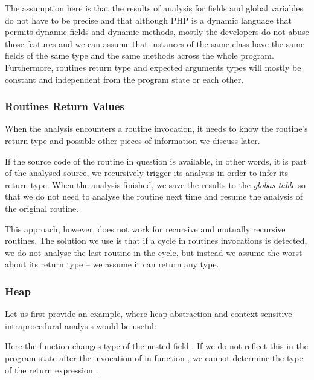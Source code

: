        The assumption here is that the results of analysis for fields 
        and global variables do not have to be precise and that although 
        PHP is a dynamic language that permits dynamic fields and dynamic 
        methods, mostly the developers do not abuse those features and 
        we can assume that instances of the same class have the same 
        fields of the same type and the same methods across the whole 
        program. Furthermore, routines return type and expected 
        arguments types will mostly be constant and independent 
        from the program state or each other.
        
        \subsubsection*{Routines Return Values}
        When the analysis encounters a routine invocation, it needs 
        to know the routine's return type and possible other pieces 
        of information we discuss later.
        
        If the source code of the routine in question is available, 
        in other words, it is part of the analysed source, we 
        recursively trigger its analysis in order to infer its 
        return type. When the analysis finished, we save the 
        results to the \emph{globas table} so that we do not 
        need to analyse the routine next time and resume the 
        analysis of the original routine.
        
        This approach, however, does not work for recursive 
        and mutually recursive routines. The solution we use 
        is that if a cycle in routines invocations is detected, 
        we do not analyse the last routine in the cycle, but 
        instead we assume the worst about its return type -- 
        we assume it can return any type.
        
        
        \subsubsection*{Heap}        
        Let us first provide an example, where heap abstraction and 
        context sensitive intraprocedural analysis would be useful:
        
%
        
        Here the function  changes type of the nested field 
        . If we do not reflect this in the program 
        state after the invocation of  in 
        function , we cannot determine the type of 
        the return expression .
        
